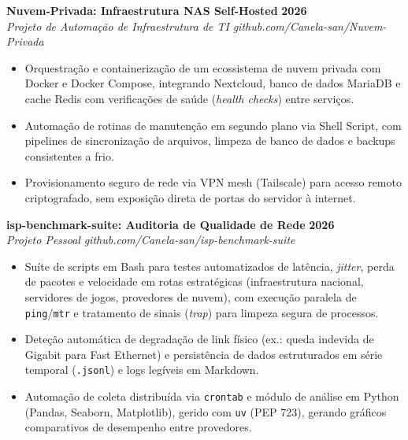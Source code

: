 \documentclass[a4paper,11pt]{article}
\newcommand{\entry}[4]{%
  \noindent\textbf{#1} \hfill \textbf{#2}\\
  \textit{#3} \hfill \textit{#4}
  \vspace{3pt}
}
\newcommand{\entrygap}{\vspace{9pt}}
\begin{document}
\entry{Nuvem-Privada: Infraestrutura NAS Self-Hosted}{2026}{Projeto de Automação de Infraestrutura de TI}{github.com/Canela-san/Nuvem-Privada}
\begin{itemize}
\item Orquestração e containerização de um ecossistema de nuvem privada com Docker e Docker Compose, integrando Nextcloud, banco de dados MariaDB e cache Redis com verificações de saúde (\textit{health checks}) entre serviços.
\item Automação de rotinas de manutenção em segundo plano via Shell Script, com pipelines de sincronização de arquivos, limpeza de banco de dados e backups consistentes a frio.
\item Provisionamento seguro de rede via VPN mesh (Tailscale) para acesso remoto criptografado, sem exposição direta de portas do servidor à internet.
\end{itemize}
\entrygap

\entry{isp-benchmark-suite: Auditoria de Qualidade de Rede}{2026}{Projeto Pessoal}{github.com/Canela-san/isp-benchmark-suite}
\begin{itemize}
\item Suíte de scripts em Bash para testes automatizados de latência, \textit{jitter}, perda de pacotes e velocidade em rotas estratégicas (infraestrutura nacional, servidores de jogos, provedores de nuvem), com execução paralela de \texttt{ping}/\texttt{mtr} e tratamento de sinais (\textit{trap}) para limpeza segura de processos.
\item Deteção automática de degradação de link físico (ex.: queda indevida de Gigabit para Fast Ethernet) e persistência de dados estruturados em série temporal (\texttt{.jsonl}) e logs legíveis em Markdown.
\item Automação de coleta distribuída via \texttt{crontab} e módulo de análise em Python (Pandas, Seaborn, Matplotlib), gerido com \texttt{uv} (PEP 723), gerando gráficos comparativos de desempenho entre provedores.
\end{itemize}
\entrygap
\end{document}
